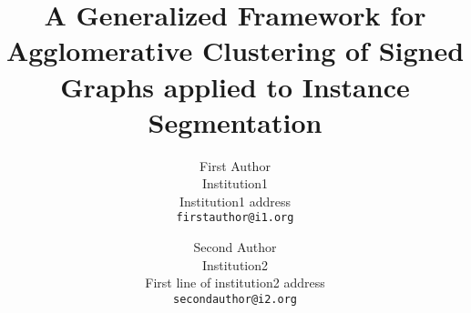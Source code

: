 \documentclass[10pt,twocolumn,letterpaper]{article}
\begin{document}
\title{A Generalized Framework for Agglomerative Clustering of Signed Graphs 
applied to Instance Segmentation}

\author{First Author\\
Institution1\\
Institution1 address\\
{\tt\small firstauthor@i1.org}
\and
Second Author\\
Institution2\\
First line of institution2 address\\
{\tt\small secondauthor@i2.org}
}





\maketitle











{\small


}
\newpage

\end{document}

